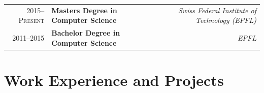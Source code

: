 \documentclass[a4paper,11pt]{article} %
\begin{document}
\begin{tabularx}{\textwidth}{r X r} 	
2015--\textsc{Present} & 
\textbf{Masters Degree in Computer Science} & 
\textit{Swiss Federal Institute of Technology (EPFL)}\\


2011--2015 & 
\textbf{Bachelor Degree in Computer Science} & 
\textit{ EPFL }\\


\end{tabularx}


\section{Work Experience and Projects}
\end{document}
